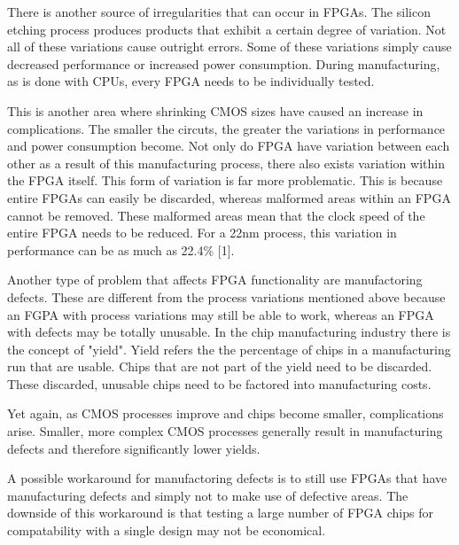 \documentclass{article}
\begin{document}
    There is another source of irregularities that can occur in FPGAs. The silicon etching
    process produces products that exhibit a certain degree of variation.
    Not all of these variations cause outright errors. Some of these variations simply
    cause decreased performance or increased power consumption. During manufacturing,
    as is done with CPUs, every FPGA needs to be individually tested.

    This is another area where shrinking CMOS sizes have caused an increase in complications.
    The smaller the circuts, the greater the variations in performance and power consumption
    become.
    Not only do FPGA have variation between each other as a result of this manufacturing process,
    there also exists variation within the FPGA itself. This form of variation
    is far more problematic. This is because entire FPGAs can easily be discarded,
    whereas malformed areas within an FPGA cannot be removed. These malformed areas
    mean that the clock speed of the entire FPGA needs to be reduced. For
    a 22nm process, this variation in performance can be as much as 22.4\% [1].

    Another type of problem that affects FPGA functionality are manufactoring defects.
    These are different from the process variations mentioned above because an FGPA
    with process variations may still be able to work, whereas an FPGA with defects
    may be totally unusable. In the chip manufacturing industry there is the concept of
    "yield". Yield refers the the percentage of chips in a manufacturing run that
    are usable. Chips that are not part of the yield need to be discarded. These
    discarded, unusable chips need to be factored into manufacturing costs.

    Yet again, as CMOS processes improve and chips become smaller, complications arise.
    Smaller, more complex CMOS processes generally result in manufacturing defects and therefore
    significantly lower yields.

    A possible workaround for manufactoring defects is to still use FPGAs that have manufacturing
    defects and simply not to make use of defective areas.
    The downside of this workaround is that testing a large number of FPGA chips for compatability
    with a single design may not be economical.
\end{document}
